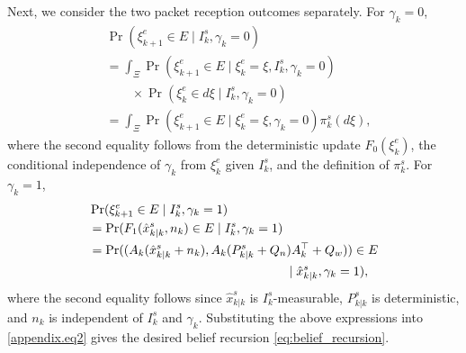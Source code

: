 \documentclass[letterpaper, 10 pt, conference]{ieeeconf}
\begin{document}
Next, we consider the two packet reception outcomes separately. For $\gamma_k=0$,
\begin{align*}
    &\operatorname{Pr}(\xi^e_{k+1}\in E\mid I_k^s,\gamma_k=0)\\
    &= \int_{\Xi} \operatorname{Pr}(\xi^e_{k+1}\in E\mid \xi_k^e=\xi,I_k^s,\gamma_k=0) \\
    &\qquad \times\operatorname{Pr}(\xi_k^e\in d\xi\mid I_k^s,\gamma_k=0)\\
    & = \int_{\Xi} \operatorname{Pr}(\xi^e_{k+1}\in E\mid \xi_k^e=\xi,\gamma_k=0)\pi_k^s(d\xi),
\end{align*}
where the second equality follows from the deterministic update $F_0(\xi_k^e)$, the conditional independence of $\gamma_k$ from $\xi_k^e$ given $I_k^s$, and the definition of $\pi_k^s$.
For $\gamma_k=1$, 
\begin{align*}
    &\operatorname{Pr}(\xi^e_{k+1}\in E\mid I_k^s,\gamma_k=1)\\
    &= \operatorname{Pr}(F_1(\hat{x}^s_{k|k},n_k)\in E\mid I_k^s,\gamma_k=1)\\
    & = \operatorname{Pr}( (A_k(\hat{x}^s_{k|k}+n_k),A_k(P^s_{k|k}+Q_n)A_k^\top+Q_w))\in E\\
    &\hspace{55mm}
{} \mid \hat{x}^s_{k|k},\gamma_k=1),
\end{align*}
where the second equality follows since $\hat{x}^s_{k|k}$ is $I_k^s$-measurable, $P^s_{k|k}$ is deterministic, and $n_k$ is independent of $I_k^s$ and $\gamma_k$. 
Substituting the above expressions into \eqref{appendix.eq2} gives the desired belief recursion \eqref{eq:belief_recursion}.



\end{document}

